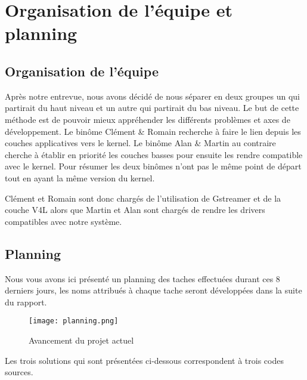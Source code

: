 
\chapter{Organisation de l'équipe et planning} %

\label{Chapter1} %


\section{Organisation de l'équipe}

Après notre entrevue, nous avons décidé de nous séparer en deux groupes un qui
partirait du haut niveau et un autre qui partirait du bas niveau. Le but de
cette méthode est de pouvoir mieux appréhender les différents problèmes et axes
de développement. Le binôme Clément \& Romain recherche à faire le lien depuis
les couches applicatives vers le kernel. Le binôme Alan \& Martin au contraire
cherche à établir en priorité les couches basses pour ensuite les rendre
compatible avec le kernel. Pour résumer les deux binômes n’ont pas le même point
de départ tout en ayant la même version du kernel.

Clément et Romain sont donc chargés de l’utilisation de Gstreamer et de la
couche V4L alors que Martin et Alan sont chargés de rendre les drivers
compatibles avec notre système.

\section{Planning}

Nous vous avons ici présenté un planning des taches effectuées durant ces 8 \\
derniers jours, les noms attribués à chaque tache seront développées dans la suite du rapport.

\begin{figure}[th]
    \centering
    \texttt{[image: planning.png]}
    \decoRule
    \caption{Avancement du projet actuel}  \label{fig:planning}
\end{figure}

Les trois solutions qui sont présentées ci-dessous correspondent à trois codes sources.


